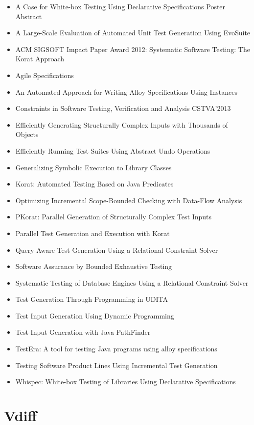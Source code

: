 \begin{itemize}
\item A Case for White-box Testing Using Declarative Specifications Poster Abstract
\item A Large-Scale Evaluation of Automated Unit Test Generation Using EvoSuite
\item ACM SIGSOFT Impact Paper Award 2012: Systematic Software Testing: The Korat Approach
\item Agile Specifications
\item An Automated Approach for Writing Alloy Specifications Using Instances
\item Constraints in Software Testing, Verification and Analysis CSTVA'2013
\item Efficiently Generating Structurally Complex Inputs with Thousands of Objects
\item Efficiently Running Test Suites Using Abstract Undo Operations
\item Generalizing Symbolic Execution to Library Classes
\item Korat: Automated Testing Based on Java Predicates
\item Optimizing Incremental Scope-Bounded Checking with Data-Flow Analysis
\item PKorat: Parallel Generation of Structurally Complex Test Inputs
\item Parallel Test Generation and Execution with Korat
\item Query-Aware Test Generation Using a Relational Constraint Solver
\item Software Assurance by Bounded Exhaustive Testing
\item Systematic Testing of Database Engines Using a Relational Constraint Solver
\item Test Generation Through Programming in UDITA
\item Test Input Generation Using Dynamic Programming
\item Test Input Generation with Java PathFinder
\item TestEra: A tool for testing Java programs using alloy specifications
\item Testing Software Product Lines Using Incremental Test Generation
\item Whispec: White-box Testing of Libraries Using Declarative Specifications
\end{itemize}


\section{Vdiff}

